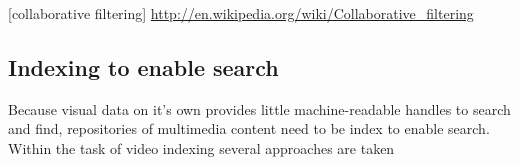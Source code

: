 [collaborative filtering] \url{http://en.wikipedia.org/wiki/Collaborative_filtering}

\subsection{Indexing to enable search}
Because visual data on it's own provides little machine-readable handles to search and find, repositories of multimedia content need to be index to enable search. Within the task of video indexing several approaches are taken 




